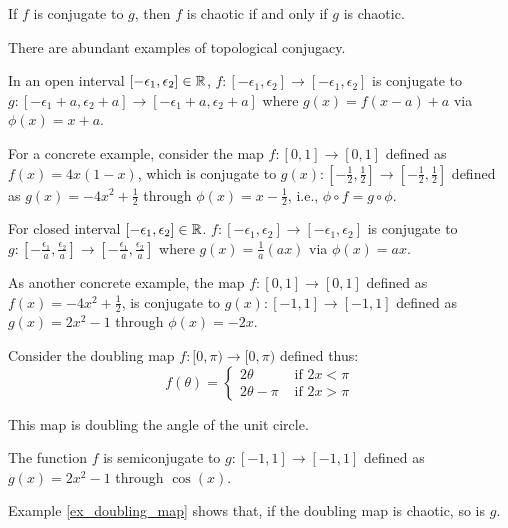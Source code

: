 \begin{prop}\label{prop_conj_chaos}
	If $f$ is conjugate to $g$, then $f$ is chaotic if and only if $g$ is chaotic.
\end{prop}

There are abundant examples of topological conjugacy.

\begin{example}
	In an open interval $[-\epsilon_1, \epsilon_2] \in \mathbb{R}$,
	$f: [-\epsilon_1, \epsilon_2] \rightarrow [-\epsilon_1, \epsilon_2]$
	is conjugate to 
	$g: [-\epsilon_1 + a, \epsilon_2 + a] \rightarrow  [-\epsilon_1 + a, \epsilon_2 + a]$
	where $g(x)= f(x -a) + a$ via $\phi(x) = x + a$.

	For a concrete example, consider the map 
	$f: [0,1] \rightarrow [0,1]$
	defined as $f(x) = 4x(1-x)$,
	which is conjugate to 
	$g(x): [-\frac{1}{2}, \frac{1}{2}] \rightarrow [-\frac{1}{2}, \frac{1}{2}]$
	defined as $g(x) = -4x^2 + \frac{1}{2}$ 
	through $\phi(x) = x -\frac{1}{2}$, i.e., $ \phi \circ f=  g \circ \phi$.
\end{example}

\begin{example}
	For closed interval $[-\epsilon_1, \epsilon_2] \in \mathbb{R}$. 
	$f: [-\epsilon_1, \epsilon_2] \rightarrow [-\epsilon_1, \epsilon_2]$
	is conjugate to 
	$g: [-\frac{\epsilon_1}{a}, \frac{\epsilon_2}{a}] \rightarrow [-\frac{\epsilon_1}{a}, \frac{\epsilon_2}{a}]$
	where $g(x)= \frac{1}{a}(ax)$ via $\phi(x) = ax$.

	As another concrete example, the map $f: [0,1] \rightarrow [0,1]$
	defined as $f(x) = -4x^2 + \frac{1}{2}$,
	is conjugate to 
	$g(x): [-1, 1] \rightarrow [-1, 1]$
	defined as $g(x) = 2x^2 - 1$
	through $\phi(x) = -2x$.
\end{example}

\begin{example}
	Consider the doubling map $f: [0,\pi) \rightarrow [0, \pi)$ defined thus: 
	$$
	f(\theta) = 
		\begin{cases}
			2 \theta &\text{ if } 2x <  \pi \\
			2 \theta - \pi &\text{ if } 2x > \pi
		\end{cases}
	$$
	
	This map is doubling the angle of the unit circle.

	The function $f$ is semiconjugate to $g: [-1, 1] \rightarrow [-1, 1]$ defined as $g(x) = 2x^2 - 1$ through $\cos(x)$.

	Example \ref{ex_doubling_map} shows that, if the doubling map is chaotic, so is $g$.
\end{example}

